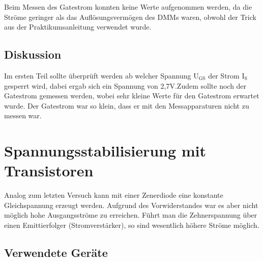 \documentclass[12pt,a4paper]{article}
\begin{document}
Beim Messen des Gatestrom konnten keine Werte aufgenommen werden, da die Ströme geringer als das Auflösungsvermögen des DMMs waren, obwohl der Trick aus der Praktikumsanleitung verwendet wurde.

\subsection{Diskussion}

Im ersten Teil sollte überprüft werden ab welcher Spannung U$_\text{GS}$ der Strom I$_\text{S}$ gesperrt wird, dabei ergab sich ein Spannung von 2,7V.Zudem sollte noch der Gatestrom gemessen werden, wobei sehr kleine Werte für den Gatestrom erwartet wurde. Der Gatestrom war so klein, dass er mit den Messapparaturen nicht zu messen war.

\section{Spannungsstabilisierung mit Transistoren}
Analog zum letzten Versuch kann mit einer Zenerdiode eine konstante Gleichspannung erzeugt werden. Aufgrund des Vorwiderstandes war es aber nicht möglich hohe Ausgangsströme zu erreichen. Führt man die Zehnerspannung über einen Emittierfolger (Stromverstärker), so sind wesentlich höhere Ströme möglich.
\subsection{Verwendete Geräte}
\end{document}
